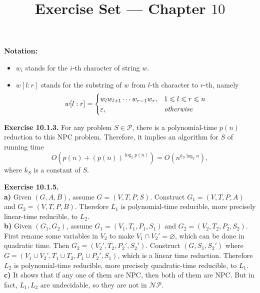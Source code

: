 \documentclass[a4paper]{article}
\title{Exercise Set --- Chapter $10$}
\date{}
\newenvironment{exercise}[1]{
	\par
	\noindent\textbf{Exercise #1.}\quad
}{
	\par
	\bigskip
}
\begin{document}
\maketitle

\noindent\textbf{Notation:}
\begin{itemize}
\item $w_i$ stands for the $i$-th character of string $w$.
\item $w[l:r]$ stands for the substring of $w$ from $l$-th character to $r$-th, namely
    $$
        w[l:r]=\begin{cases}
            w_lw_{l+1}\cdots w_{r-1}w_r, & 1\leqslant l\leqslant r\leqslant n\\
            \varepsilon, & \it otherwise
        \end{cases}
    $$
\end{itemize}

\begin{exercise}{10.1.3} For any problem $S\in\mathcal P$, there is a polynomial-time $p(n)$ reduction
    to this NPC problem. Therefore, it implies an algorithm for $S$ of running time
    $$
    O\left(p(n)+(p(n))^{\log_2 p(n)}\right)=O\left(n^{k_S\log_2 n}\right),
    $$
    where $k_S$ is a constant of $S$.
\end{exercise}

\begin{exercise}{10.1.5} \hspace{0pt}\\
\textbf{a)} Given $(G,A,B)$, assume $G=(V,T,P,S)$. Construct $G_1=(V,T,P,A)$ and $G_2=(V,T,P,B)$.
Therefore $L_1$ is polynomial-time reducible, more precisely linear-time reducible, to $L_2$.\\
\textbf{b)} Given $(G_1,G_2)$, assume $G_1=(V_1,T_1,P_1,S_1)$ and $G_2=(V_2,T_2,P_2,S_2)$. First rename some variables in
$V_2$ to make $V_1\cap V_2'=\varnothing$, which can be done in quadratic time. Then $G_2=(V_2',T_2,P_2',S_2')$.
Construct $(G,S_1,S_2')$ where $G=(V_1\cup V_2',T_1\cup T_2,P_1\cup P_2',S_1)$, which is a linear time reduction.
Therefore $L_2$ is polynomial-time reducible, more precisely quadratic-time reducible, to $L_1$.\\
\textbf{c)} It shows that if any one of them are NPC, then both of them are NPC. But in fact, $L_1,L_2$ are undecidable,
so they are not in $\mathcal{NP}$.
\end{exercise}
\end{document}
